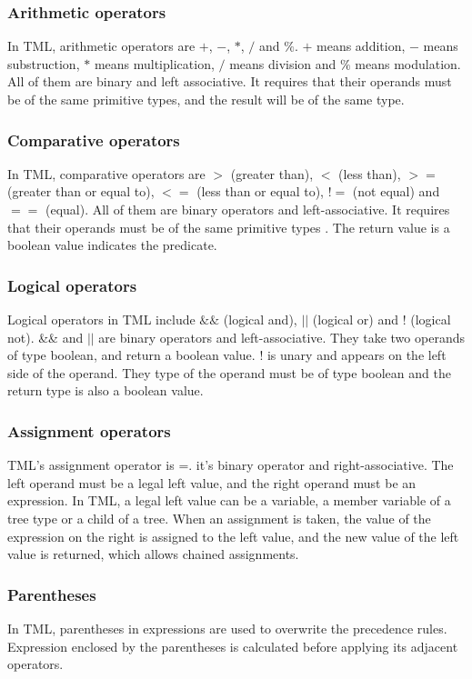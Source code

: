\documentclass[12pt,psfig,a4]{article}
\begin{document}
\subsubsection{Arithmetic operators}
In TML, arithmetic operators are $+$, $-$, $*$, $/$ and $\%$. $+$ means addition, $-$ means substruction, $*$ means multiplication, $/$ means division and $\%$ means modulation. All of them are binary and left associative. It requires that their operands must be of the same primitive types, and the result will be of the same type.

\subsubsection{Comparative operators}
In TML, comparative operators are $>$ (greater than), $<$ (less than), $>=$ (greater than or equal to), $<=$ (less than or equal to), $!=$ (not equal) and $==$ (equal). All of them are binary operators and left-associative. It requires that their operands must be of the same primitive types . The return value is a boolean value indicates the predicate.

\subsubsection{Logical operators}
Logical operators in TML include $\&\&$ (logical and), $||$ (logical or) and ! (logical not). \&\& and $||$ are binary operators and left-associative. They take two operands of type boolean, and return a boolean value. ! is unary and appears on the left side of the operand. They type of the operand must be of type boolean and the return type is also a boolean value.

\subsubsection{Assignment operators}
TML's assignment operator is =. it's binary operator and right-associative. The left operand must be a legal left value, and the right operand must be an expression. In TML, a legal left value can be a variable, a member variable of a tree type or a child of a tree. When an assignment is taken, the value of the expression on the right is assigned to the left value, and the new value of the left value is returned, which allows chained assignments. 

\subsubsection{Parentheses}
In TML, parentheses in expressions are used to overwrite the precedence rules. Expression enclosed by the parentheses is calculated before applying its adjacent operators.
\end{document}
